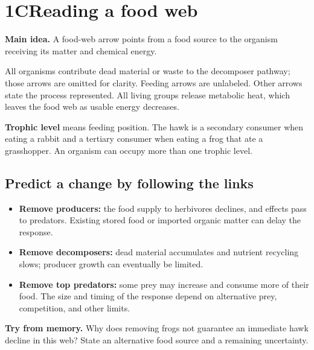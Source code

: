 \documentclass[11pt,letterpaper]{article}
\newcommand{\pagechapter}[2]{\clearpage\section*{#1}\phantomsection\label{#2}\addcontentsline{toc}{section}{#1}}
\newcommand{\idea}[1]{\textbf{Main idea.} #1\par}
\newcommand{\memorycheck}[1]{\par\smallskip\textbf{Try from memory.} #1\par}
\begin{document}
\pagechapter{1C\quad Reading a food web}{web}
\idea{A food-web arrow points from a food source to the organism receiving its matter and chemical energy.}
\begin{center}
\par
\end{center}
All organisms contribute dead material or waste to the decomposer pathway; those arrows are omitted for clarity. Feeding arrows are unlabeled. Other arrows state the process represented. All living groups release metabolic heat, which leaves the food web as usable energy decreases.

\textbf{Trophic level} means feeding position. The hawk is a secondary consumer when eating a rabbit and a tertiary consumer when eating a frog that ate a grasshopper. An organism can occupy more than one trophic level.
\subsection*{Predict a change by following the links}
\begin{itemize}
\item \textbf{Remove producers:} the food supply to herbivores declines, and effects pass to predators. Existing stored food or imported organic matter can delay the response.
\item \textbf{Remove decomposers:} dead material accumulates and nutrient recycling slows; producer growth can eventually be limited.
\item \textbf{Remove top predators:} some prey may increase and consume more of their food. The size and timing of the response depend on alternative prey, competition, and other limits.
\end{itemize}
\memorycheck{Why does removing frogs not guarantee an immediate hawk decline in this web? State an alternative food source and a remaining uncertainty.}
\end{document}
